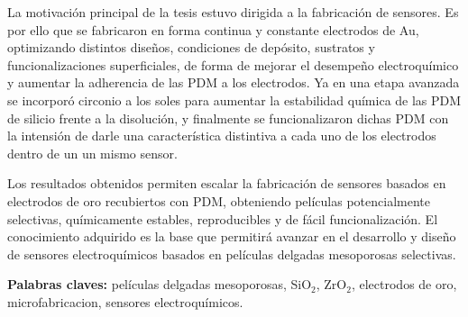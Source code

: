 La motivación principal de la tesis estuvo dirigida a la fabricación de sensores. Es por ello que se fabricaron en forma continua y constante electrodos de Au, optimizando distintos diseños, condiciones de depósito, sustratos y funcionalizaciones superficiales, de forma de mejorar el desempeño electroquímico y aumentar la adherencia de las PDM a los electrodos. Ya en una etapa avanzada se incorporó circonio a los soles para aumentar la estabilidad química de las PDM de silicio frente a la disolución, y finalmente se funcionalizaron dichas PDM con la intensión de darle una característica distintiva a cada uno de los electrodos dentro de un un mismo sensor.

Los resultados obtenidos permiten escalar la fabricación de sensores basados en electrodos de oro recubiertos con PDM, obteniendo películas potencialmente selectivas, químicamente estables, reproducibles y de fácil funcionalización. El conocimiento adquirido es la base que permitirá avanzar en el desarrollo y diseño de sensores electroquímicos basados en películas delgadas mesoporosas selectivas. 
\vspace*{\fill}

\vfill

\noindent\textbf{Palabras claves:} películas delgadas mesoporosas, SiO$_2$, ZrO$_2$, electrodos de oro, microfabricacion, sensores electroquímicos.

\cleardoublepage
